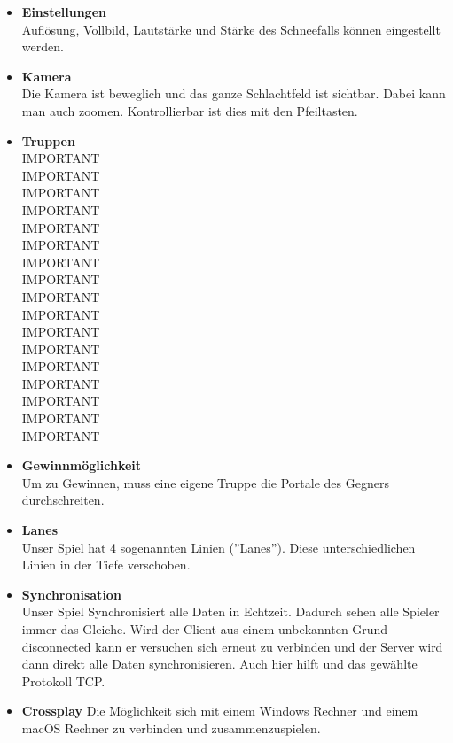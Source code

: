 \begin{itemize}
\begin{itemize}
        \end{itemize}
    \item \textbf{Einstellungen} \\
        Auflösung, Vollbild, Lautstärke und Stärke des Schneefalls können eingestellt werden.
    \item \textbf{Kamera} \\
        Die Kamera ist beweglich und das ganze Schlachtfeld ist sichtbar. Dabei kann man auch zoomen. Kontrollierbar ist dies mit den Pfeiltasten.
    \item \textbf{Truppen} \\
        IMPORTANT\\
        IMPORTANT\\
        IMPORTANT\\
        IMPORTANT\\
        IMPORTANT\\
        IMPORTANT\\
        IMPORTANT\\
        IMPORTANT\\
        IMPORTANT\\
        IMPORTANT\\
        IMPORTANT\\
        IMPORTANT\\
        IMPORTANT\\
        IMPORTANT\\
        IMPORTANT\\
        IMPORTANT\\
        IMPORTANT\\
    \item \textbf{Gewinnmöglichkeit} \\
        Um zu Gewinnen, muss eine eigene Truppe die Portale des Gegners durchschreiten.
    \item \textbf{Lanes} \\
        Unser Spiel hat 4 sogenannten Linien (''Lanes''). Diese unterschiedlichen Linien in der Tiefe verschoben.
    \item \textbf{Synchronisation} \\
        Unser Spiel Synchronisiert alle Daten in Echtzeit. Dadurch sehen alle Spieler immer das Gleiche. Wird der Client aus einem unbekannten Grund disconnected kann er versuchen
        sich erneut zu verbinden und der Server wird dann direkt alle Daten synchronisieren. Auch hier hilft und das gewählte Protokoll TCP.
    \item \textbf{Crossplay}
        Die Möglichkeit sich mit einem Windows Rechner und einem macOS Rechner zu verbinden und zusammenzuspielen.
\end{itemize}

